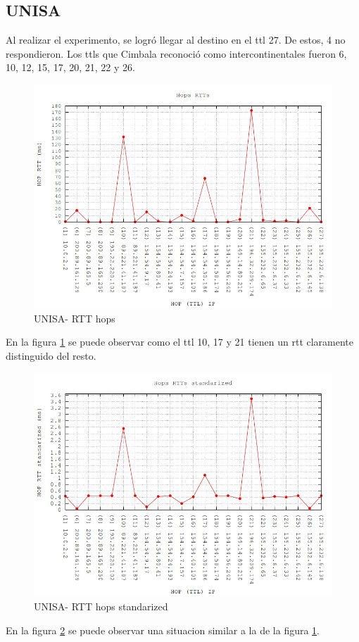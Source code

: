 \subsection{UNISA}

Al realizar el experimento, se logró llegar al destino en el ttl 27. De estos, 4 no respondieron. Los ttls que Cimbala reconoció como intercontinentales fueron 6, 10, 12, 15, 17, 20, 21, 22 y 26.

\begin{figure}[h!]
  \centering
    \includegraphics[scale=0.6]{imagenes/unisa-graficos/traceroute-unisa.jpg}
  \caption{UNISA- RTT hops}
  \label{fig:1}
\end{figure}

En la figura \ref{fig:1} se puede observar como el ttl 10, 17 y 21 tienen un rtt claramente distinguido del resto.

\begin{figure}[h!]
  \centering
    \includegraphics[scale=0.6]{imagenes/unisa-graficos/traceroute-unisa-standarized.jpg}
  \caption{UNISA- RTT hops standarized}
  \label{fig:2}
\end{figure}

En la figura \ref{fig:2} se puede observar una situacion similar a la de la figura \ref{fig:1}.

